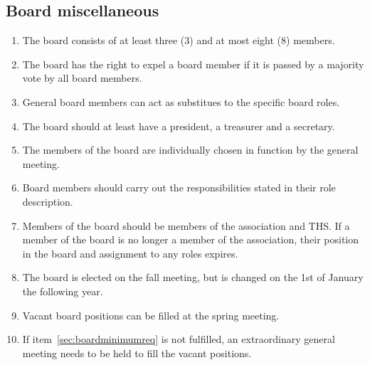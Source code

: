 \subsection{Board miscellaneous}
\begin{enumerate}
  \item The board consists of at least three (3) and at most eight (8) members.
  \item The board has the right to expel a board member if it is passed by a majority vote by all board members.
  \item General board members can act as substitues to the specific board roles.
  \item The board should at least have a president, a treasurer and a secretary. \label{sec:boardminimumreq}
  \item The members of the board are individually chosen in function by the general meeting.
  \item Board members should carry out the responsibilities stated in their role description.
  \item Members of the board should be members of the association and THS. If a member of the board is no longer a member of the association, their position in the board and assignment to any roles expires.
  \item The board is elected on the fall meeting, but is changed on the 1st of January the following year.
  \item Vacant board positions can be filled at the spring meeting.
  \item If item~\ref{sec:boardminimumreq} is not fulfilled, an extraordinary general meeting needs to be held to fill the vacant positions.
\end{enumerate}


